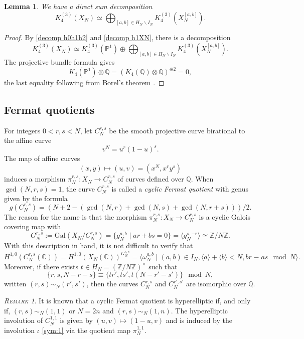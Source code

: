 \documentclass[11pt,a4,leqno]{amsart}
\theoremstyle{my theoremstyle}
\newtheorem{lem}[thm]{Lemma}
\theoremstyle{dfn}
\theoremstyle{remark}
\newtheorem{rmk}[thm]{{\scshape Remark}}
\renewcommand{\1}{\mathbbm{1}}
\newcommand{\Z}{\mathbb{Z}}
\newcommand{\Q}{\mathbb{Q}}
\newcommand{\C}{\mathbb{C}}
\numberwithin{equation}{section}
\begin{document}
\begin{lem}\label{lem:K4decomp}
    We have a direct sum decomposition
\[ 
K_4^{(3)}(X_{N}) \simeq \bigoplus_{[a, b] \in H_N \backslash I_N} K_4^{(3)}(X_{N}^{[a,b]}).
\]
\end{lem}

\begin{proof}
    By \eqref{decomp h0h1h2} and \eqref{decomp h1XN}, there is a decomposition
\[ 
K_4^{(3)}(X_{N}) \simeq K_4^{(3)}(\mathbb{P}^1) \oplus \bigoplus_{[a, b] \in H_N \backslash I_N} K_4^{(3)}(X_{N}^{[a,b]}).
\]
The projective bundle formula \cite[\S 8 Theorem 2.1]{Qui} gives 
\begin{equation}\label{eq:K4P1}
    K_4(\mathbb{P}^1)\otimes \Q=(K_4(\Q)\otimes \Q)^{\oplus 2}=0,
\end{equation}
the last equality following from Borel's theorem \cite[Theorem IV.1.18]{Wei13}.
\end{proof}

\subsection{Fermat quotients}

For integers $0<r,s<N$, let $C_N^{r,s}$ be the smooth projective curve birational to the affine curve 
$$v^N = u^r (1-u)^s.$$ 
The map of affine curves 
\begin{equation}\label{map:quot_rs}
(x,y)\longmapsto (u,v)=(x^N,x^r y^s)
\end{equation} 
induces a morphism $\pi^{r,s}_N \colon X_N \to C_N^{r,s}$ of curves defined over $\Q$.  
When $\gcd(N,r,s)=1$, the curve $C^{r,s}_N$ is called a {\it cyclic Fermat quotient} with genus given by the formula
$$g(C_N^{r,s}) = (N+2-(\gcd(N,r)+\gcd(N,s)+\gcd(N,r+s)))/2.$$
The reason for the name is that the morphism $\pi^{r,s}_N \colon X_N \to C_N^{r,s}$ is a cyclic Galois covering map with 
\[
G_N^{r,s} := \mathrm{Gal}(X_N/C_N^{r,s}) =\{ g_N^{a,b} \mid ar+bs =0 \} = \langle g_N^{s,-r} \rangle \simeq \Z/N\Z.
\] 
With this description in hand, it is not difficult to verify that 
\[
H^{1,0}(C_N^{r,s}(\C))=H^{1,0}(X_N(\C))^{G_N^{r,s}}=\langle \omega_N^{a,b} \mid (a,b) \in I_N, \langle a \rangle + \langle b \rangle < N, br \equiv as \mod N  \rangle.
\]
Moreover, if there exists $t\in H_N=(\Z/N\Z)^\times$ such that 
\[
\{ r,s,N-r-s \} \equiv \{ tr',ts',t(N-r'-s') \} \mod N,
\]
written $(r,s) \sim_N (r',s')$, then the curves $C_N^{r,s}$ and $C_N^{r',s'}$ are isomorphic over $\Q$. 

\begin{rmk}
It is known that a cyclic Fermat quotient is hyperelliptic if, and only if, $(r,s)\sim_N (1,1)$ or $N=2n$ and $(r,s)\sim_N (1,n)$. The hyperelliptic involution of $C^{1,1}_N$ is given by $(u,v)\mapsto (1-u, v)$ and is induced by the involution $\iota$ \eqref{sym:1} via the quotient map $\pi^{1,1}_N$.
\end{rmk}
\end{document}
